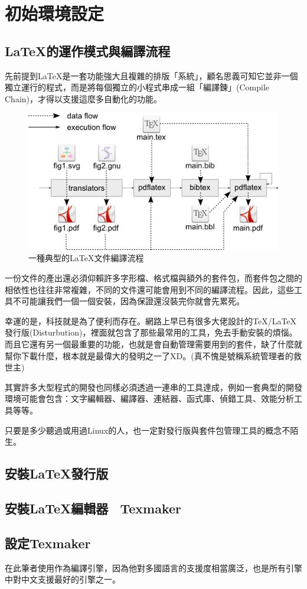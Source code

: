\documentclass{../indiv}
\begin{document}
	\chapter{初始環境設定}
	\section{\LaTeX 的運作模式與編譯流程}
	先前提到\LaTeX 是一套功能強大且複雜的排版「系統」，顧名思義可知它並非一個獨立運行的程式，而是將每個獨立的小程式串成一組「編譯鍊」(Compile Chain)，才得以支援這麼多自動化的功能。
	\begin{figure}[H]
		\centering
		\includegraphics[width=0.6\linewidth]{process.png}
		\caption{一種典型的\LaTeX 文件編譯流程}
		\label{fig:Compile Process}
	\end{figure}
	一份文件的產出還必須仰賴許多字形檔、格式檔與額外的套件包，而套件包之間的相依性也往往非常複雜，不同的文件還可能會用到不同的編譯流程。因此，這些工具不可能讓我們一個一個安裝，因為保證還沒裝完你就會先累死。
	
	幸運的是，科技就是為了便利而存在。網路上早已有很多大佬設計的\TeX /\LaTeX 發行版(Disturbution)，裡面就包含了那些最常用的工具，免去手動安裝的煩惱。而且它還有另一個最重要的功能，也就是會自動管理需要用到的套件，缺了什麼就幫你下載什麼，根本就是最偉大的發明之一了XD。(真不愧是號稱系統管理者的救世主)
	\begin{extra}
		\item 其實許多大型程式的開發也同樣必須透過一連串的工具達成，例如一套典型的開發環境可能會包含：文字編輯器、編譯器、連結器、函式庫、偵錯工具、效能分析工具等等。
		\item 只要是多少聽過或用過Linux的人，也一定對發行版與套件包管理工具的概念不陌生。
	\end{extra}

	\section{安裝\LaTeX 發行版 \textemdash\ }
	\section{安裝\LaTeX 編輯器 \textemdash\ Texmaker}
	
	\section{設定Texmaker}
	在此筆者使用作為編譯引擎，因為他對多國語言的支援度相當廣泛，也是所有引擎中對中文支援最好的引擎之一。
\end{document}
